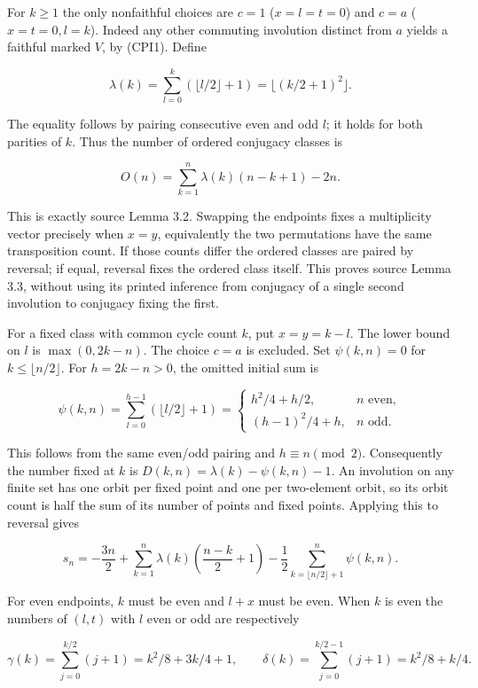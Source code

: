 \documentclass[
  11pt,
  a4paper,
]{article}
\begin{document}
For \(k\ge1\) the only nonfaithful choices are \(c=1\) (\(x=l=t=0\)) and
\(c=a\) (\(x=t=0,l=k\)). Indeed any other commuting involution distinct
from \(a\) yields a faithful marked \(V\), by (CPI1). Define

\[
 \lambda(k)=\sum_{l=0}^k(\lfloor l/2\rfloor+1)
 =\lfloor(k/2+1)^2\rfloor.
 \tag{CPI4}
\]

The equality follows by pairing consecutive even and odd \(l\); it holds
for both parities of \(k\). Thus the number of ordered conjugacy classes
is

\[
 O(n)=\sum_{k=1}^n\lambda(k)(n-k+1)-2n.
 \tag{CPI5}
\]

This is exactly source Lemma 3.2. Swapping the endpoints fixes a
multiplicity vector precisely when \(x=y\), equivalently the two
permutations have the same transposition count. If those counts differ
the ordered classes are paired by reversal; if equal, reversal fixes the
ordered class itself. This proves source Lemma 3.3, without using its
printed inference from conjugacy of a single second involution to
conjugacy fixing the first.

For a fixed class with common cycle count \(k\), put \(x=y=k-l\). The
lower bound on \(l\) is \(\max(0,2k-n)\). The choice \(c=a\) is
excluded. Set \(\psi(k,n)=0\) for \(k\le\lfloor n/2\rfloor\). For
\(h=2k-n>0\), the omitted initial sum is

\[
 \psi(k,n)=\sum_{l=0}^{h-1}(\lfloor l/2\rfloor+1)
 =\begin{cases}h^2/4+h/2,&n\text{ even},\\(h-1)^2/4+h,&n\text{ odd}.
 \end{cases}
 \tag{CPI6}
\]

This follows from the same even/odd pairing and \(h\equiv n\pmod2\).
Consequently the number fixed at \(k\) is
\(D(k,n)=\lambda(k)-\psi(k,n)-1\). An involution on any finite set has
one orbit per fixed point and one per two-element orbit, so its orbit
count is half the sum of its number of points and fixed points. Applying
this to reversal gives

\[
 s_n=-\frac{3n}{2}+\sum_{k=1}^n\lambda(k)\left(\frac{n-k}{2}+1\right)
 -\frac12\sum_{k=\lfloor n/2\rfloor+1}^n\psi(k,n).
 \tag{CPI7}
\]

For even endpoints, \(k\) must be even and \(l+x\) must be even. When
\(k\) is even the numbers of \((l,t)\) with \(l\) even or odd are
respectively

\[
 \gamma(k)=\sum_{j=0}^{k/2}(j+1)=k^2/8+3k/4+1,\qquad
 \delta(k)=\sum_{j=0}^{k/2-1}(j+1)=k^2/8+k/4.
 \tag{CPI8}
\]
\end{document}
